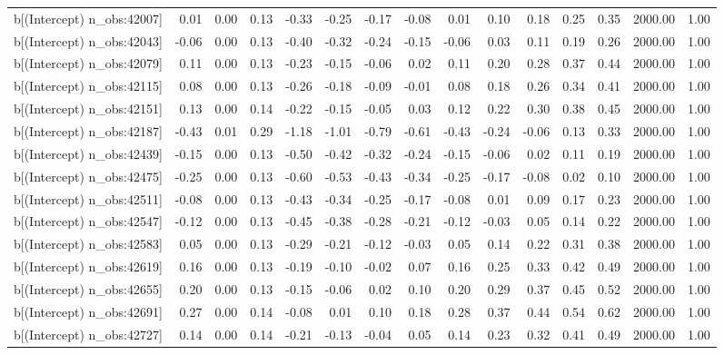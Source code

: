 \begin{table}[ht]
\begin{tabular}{rrrrrrrrrrrrrrr}
  b[(Intercept) n\_obs:42007] & 0.01 & 0.00 & 0.13 & -0.33 & -0.25 & -0.17 & -0.08 & 0.01 & 0.10 & 0.18 & 0.25 & 0.35 & 2000.00 & 1.00 \\ 
  b[(Intercept) n\_obs:42043] & -0.06 & 0.00 & 0.13 & -0.40 & -0.32 & -0.24 & -0.15 & -0.06 & 0.03 & 0.11 & 0.19 & 0.26 & 2000.00 & 1.00 \\ 
  b[(Intercept) n\_obs:42079] & 0.11 & 0.00 & 0.13 & -0.23 & -0.15 & -0.06 & 0.02 & 0.11 & 0.20 & 0.28 & 0.37 & 0.44 & 2000.00 & 1.00 \\ 
  b[(Intercept) n\_obs:42115] & 0.08 & 0.00 & 0.13 & -0.26 & -0.18 & -0.09 & -0.01 & 0.08 & 0.18 & 0.26 & 0.34 & 0.41 & 2000.00 & 1.00 \\ 
  b[(Intercept) n\_obs:42151] & 0.13 & 0.00 & 0.14 & -0.22 & -0.15 & -0.05 & 0.03 & 0.12 & 0.22 & 0.30 & 0.38 & 0.45 & 2000.00 & 1.00 \\ 
  b[(Intercept) n\_obs:42187] & -0.43 & 0.01 & 0.29 & -1.18 & -1.01 & -0.79 & -0.61 & -0.43 & -0.24 & -0.06 & 0.13 & 0.33 & 2000.00 & 1.00 \\ 
  b[(Intercept) n\_obs:42439] & -0.15 & 0.00 & 0.13 & -0.50 & -0.42 & -0.32 & -0.24 & -0.15 & -0.06 & 0.02 & 0.11 & 0.19 & 2000.00 & 1.00 \\ 
  b[(Intercept) n\_obs:42475] & -0.25 & 0.00 & 0.13 & -0.60 & -0.53 & -0.43 & -0.34 & -0.25 & -0.17 & -0.08 & 0.02 & 0.10 & 2000.00 & 1.00 \\ 
  b[(Intercept) n\_obs:42511] & -0.08 & 0.00 & 0.13 & -0.43 & -0.34 & -0.25 & -0.17 & -0.08 & 0.01 & 0.09 & 0.17 & 0.23 & 2000.00 & 1.00 \\ 
  b[(Intercept) n\_obs:42547] & -0.12 & 0.00 & 0.13 & -0.45 & -0.38 & -0.28 & -0.21 & -0.12 & -0.03 & 0.05 & 0.14 & 0.22 & 2000.00 & 1.00 \\ 
  b[(Intercept) n\_obs:42583] & 0.05 & 0.00 & 0.13 & -0.29 & -0.21 & -0.12 & -0.03 & 0.05 & 0.14 & 0.22 & 0.31 & 0.38 & 2000.00 & 1.00 \\ 
  b[(Intercept) n\_obs:42619] & 0.16 & 0.00 & 0.13 & -0.19 & -0.10 & -0.02 & 0.07 & 0.16 & 0.25 & 0.33 & 0.42 & 0.49 & 2000.00 & 1.00 \\ 
  b[(Intercept) n\_obs:42655] & 0.20 & 0.00 & 0.13 & -0.15 & -0.06 & 0.02 & 0.10 & 0.20 & 0.29 & 0.37 & 0.45 & 0.52 & 2000.00 & 1.00 \\ 
  b[(Intercept) n\_obs:42691] & 0.27 & 0.00 & 0.14 & -0.08 & 0.01 & 0.10 & 0.18 & 0.28 & 0.37 & 0.44 & 0.54 & 0.62 & 2000.00 & 1.00 \\ 
  b[(Intercept) n\_obs:42727] & 0.14 & 0.00 & 0.14 & -0.21 & -0.13 & -0.04 & 0.05 & 0.14 & 0.23 & 0.32 & 0.41 & 0.49 & 2000.00 & 1.00 \\ 

\end{tabular}
\end{table}
